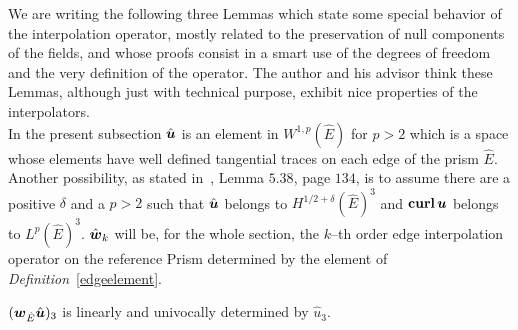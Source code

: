 We are writing the following three Lemmas which state some special
behavior of the interpolation operator, mostly related to the preservation of
null components of the fields, and whose proofs consist in a smart use of the
degrees of freedom and the very definition of the operator. The author and his
advisor think these Lemmas, although just with technical purpose, exhibit
nice properties of the interpolators.\\
\noindent In the present subsection $\hat{\boldsymbol{u}}$ is an element
in $W^{1,p}(\hat{E})$ for $p>2$ which is a space whose elements have well
defined tangential traces on each edge of the prism $\hat{E}$.
Another possibility, as stated in~\cite{monk}, Lemma $5.38$, page $134$,
is to 
assume there are 
a positive $\delta$ and a $p>2$ such that 
$\hat{\boldsymbol{u}}$ belongs to $H^{1/2+\delta}(\hat{E})^3$ and
${\bf curl}\,\boldsymbol{u}$ belongs to $L^p(\hat{E})^3$.
$\hat{\boldsymbol{w}}_k$ will be, for the whole section, the $k$--th order edge 
interpolation operator on the reference
Prism determined by the element of
\emph{Definition}~\ref{edgeelement}.
\begin{lemma}\label{lema_PIu3_k_cualquiera} 
$(\boldsymbol{w}_{\hat{E}}\hat{\boldsymbol{u}})_3$ is linearly and univocally 
determined by $\hat{u}_3$.
\end{lemma}
